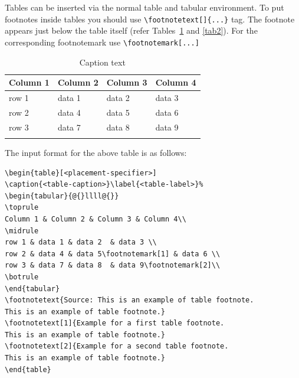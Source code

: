 \documentclass[pdflatex,sn-mathphys-num]{sn-jnl}%
\theoremstyle{thmstyleone}%
\theoremstyle{thmstyletwo}%
\theoremstyle{thmstylethree}%
\begin{document}
Tables can be inserted via the normal table and tabular environment. To put
footnotes inside tables you should use \verb+\footnotetext[]{...}+ tag.
The footnote appears just below the table itself (refer Tables~\ref{tab1} and \ref{tab2}). 
For the corresponding footnotemark use \verb+\footnotemark[...]+

\begin{table}[h]
\caption{Caption text}\label{tab1}%
\begin{tabular}{@{}llll@{}}
\toprule
Column 1 & Column 2  & Column 3 & Column 4\\
\midrule
row 1    & data 1   & data 2  & data 3  \\
row 2    & data 4   & data 5\footnotemark[1]  & data 6  \\
row 3    & data 7   & data 8  & data 9\footnotemark[2]  \\
\botrule
\end{tabular}
\end{table}

\noindent
The input format for the above table is as follows:

\bigskip
\begin{verbatim}
\begin{table}[<placement-specifier>]
\caption{<table-caption>}\label{<table-label>}%
\begin{tabular}{@{}llll@{}}
\toprule
Column 1 & Column 2 & Column 3 & Column 4\\
\midrule
row 1 & data 1 & data 2	 & data 3 \\
row 2 & data 4 & data 5\footnotemark[1] & data 6 \\
row 3 & data 7 & data 8	 & data 9\footnotemark[2]\\
\botrule
\end{tabular}
\footnotetext{Source: This is an example of table footnote. 
This is an example of table footnote.}
\footnotetext[1]{Example for a first table footnote.
This is an example of table footnote.}
\footnotetext[2]{Example for a second table footnote. 
This is an example of table footnote.}
\end{table}
\end{verbatim}
\bigskip
\end{document}
